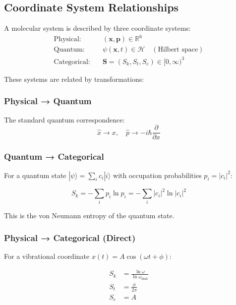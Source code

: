 \subsection{Coordinate System Relationships}

\begin{definition}
A molecular system is described by three coordinate systems:
\begin{align}
\text{Physical:} &\quad (\mathbf{x}, \mathbf{p}) \in \mathbb{R}^6 \\
\text{Quantum:} &\quad \psi(\mathbf{x}, t) \in \mathcal{H} \quad (\text{Hilbert space}) \\
\text{Categorical:} &\quad \mathbf{S} = (S_k, S_t, S_e) \in [0, \infty)^3
\end{align}
\end{definition}

These systems are related by transformations:

\subsubsection{Physical → Quantum}

The standard quantum correspondence:
\begin{equation}
\hat{x} \to x, \quad \hat{p} \to -i\hbar\frac{\partial}{\partial x}
\end{equation}

\subsubsection{Quantum → Categorical}

For a quantum state $|\psi\rangle = \sum_i c_i|i\rangle$ with occupation probabilities $p_i = |c_i|^2$:

\begin{equation}
S_k = -\sum_i p_i \ln p_i = -\sum_i |c_i|^2 \ln|c_i|^2
\end{equation}

This is the von Neumann entropy of the quantum state.

\subsubsection{Physical → Categorical (Direct)}

For a vibrational coordinate $x(t) = A\cos(\omega t + \phi)$:

\begin{align}
S_k &= \frac{\ln \omega}{\ln \omega_{\max}} \\
S_t &= \frac{\phi}{2\pi} \\
S_e &= A
\end{align}

